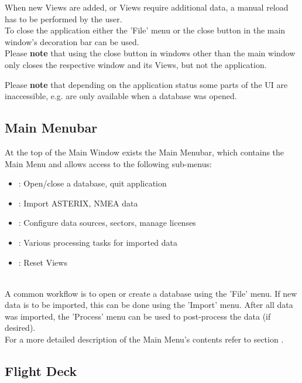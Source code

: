 When new Views are added, or Views require additional data, a manual reload has to be performed by the user. \\

To close the application either the 'File' menu or the close button in the main window's decoration bar can be used. \\

Please \textbf{note} that using the close button in windows other than the main window only closes the respective window and its Views, but not the application.

Please \textbf{note} that depending on the application status some parts of the UI are inaccessible, e.g. are only available when a database was opened.

\subsection{Main Menubar}
\label{sec:ui_main_menu_bar}

At the top of the Main Window exists the Main Menubar, which contains the Main Menu and allows access to the following sub-menus: 

\begin{itemize}
 \item {}: Open/close a database, quit application
 \item {}: Import ASTERIX, NMEA data
 \item {}: Configure data sources, sectors, manage licenses
 \item {}: Various processing tasks for imported data
 \item {}: Reset Views
\end{itemize} 
\  \\

A common workflow is to open or create a database using the 'File' menu. If new data is to be imported, this can be done using the 'Import' menu. 
After all data was imported, the 'Process' menu can be used to post-process the data (if desired). \\

For a more detailed description of the Main Menu's contents refer to section .

\subsection{Flight Deck} 
\label{sec:ui_flight_deck}

